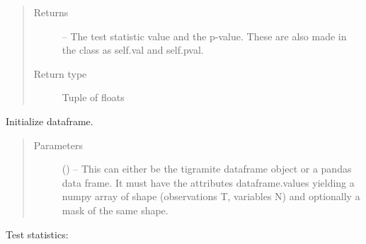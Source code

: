 \documentclass[letterpaper,10pt,english]{sphinxmanual}
\begin{document}
\begin{fulllineitems}
\begin{fulllineitems}
\begin{quote}
\begin{description}
\begin{itemize}
\end{itemize}

\item[{Returns}] \leavevmode
{} -- The test statistic value and the p-value. These are also made in the
class as self.val and self.pval.

\item[{Return type}] \leavevmode
Tuple of floats

\end{description}\end{quote}

\end{fulllineitems}


\begin{fulllineitems}
\label{\detokenize{index:tigramite.independence_tests.CondIndTest.set_dataframe}}
Initialize dataframe.
\begin{quote}\begin{description}
\item[{Parameters}] \leavevmode
{} () -- This can either be the tigramite dataframe object or a pandas data
frame. It must have the attributes dataframe.values yielding a numpy
array of shape (observations T, variables N) and optionally a mask
of the same shape.

\end{description}\end{quote}

\end{fulllineitems}


\end{fulllineitems}


Test statistics:
\end{document}
